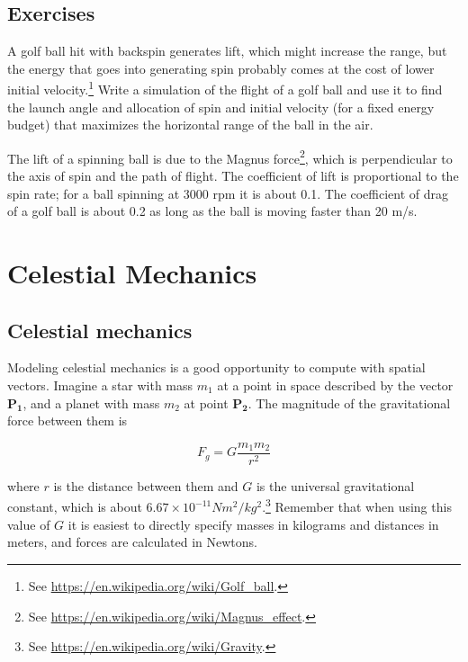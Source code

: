 \documentclass[
]{book}
\numberwithin{Answer}{chapter}
\numberwithin{Exercise}{chapter}
\renewcommand{\vec}[1]{\bm{\mathbf{#1}}}
\begin{document}
\section{Exercises}

\begin{ex}
\label{ex:golf}

A golf ball hit with backspin
generates lift, which might increase the range, but the energy that
goes into generating spin probably comes at the cost of lower initial
velocity.\footnote{See \url{https://en.wikipedia.org/wiki/Golf_ball}.}
Write a simulation of the flight of a golf ball and use it to find
the launch angle and allocation of spin and initial velocity
(for a fixed energy budget) that maximizes the horizontal range of the
ball in the air.

The lift of a spinning ball is due to the Magnus force\footnote{See
\url{https://en.wikipedia.org/wiki/Magnus_effect}.}, which is
perpendicular to the axis of spin and the path of flight.  The
coefficient of lift is proportional to the spin rate; for a ball
spinning at 3000 rpm it is about 0.1.  The coefficient of drag of a
golf ball is about 0.2 as long as the ball is moving faster than 20 m/s.
\end{ex}



\chapter{Celestial Mechanics}

\section{Celestial mechanics}

Modeling celestial mechanics is a good opportunity
to compute with spatial vectors.
Imagine a star with mass $m_1$ at a point in space described by the
vector $\vec{P_1}$, and a planet with mass $m_2$ at point $\vec{P_2}$.
The magnitude of the gravitational force between them is

\begin{equation}
F_g = G \frac{m_1 m_2}{r^2}
\end{equation}

where $r$ is the distance between them and $G$ is the universal
gravitational constant, which is about $6.67 \times 10^{-11} N m^2 /
kg^2$.\footnote{See \url{https://en.wikipedia.org/wiki/Gravity}.}
Remember that when using this
value of $G$ it is easiest to directly specify
masses
in kilograms and distances in meters, and forces are calculated in Newtons.
\end{document}
